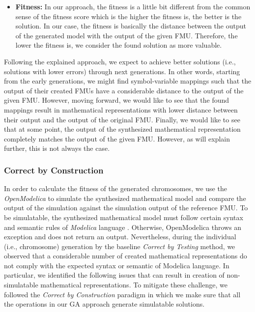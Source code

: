 \begin{itemize}
    \item \textbf{Fitness:} In our approach, the fitness is a little bit different from the common sense of the fitness score which is the higher the fitness is, the better is the solution. In our case, the fitness is basically the distance between the output of the generated model with the output of the given FMU. Therefore, the lower the fitness is, we consider the found solution as more valuable. 

\end{itemize}

Following the explained approach, we expect to achieve better solutions (i.e., solutions with lower errors) through next generations. In other words, starting from the early generations, we might find symbol-variable mappings such that the output of their created FMUs have a considerable distance to the output of the given FMU. However, moving forward, we would like to see that the found mappings result in mathematical representations with lower distance between their output and the output of the original FMU. Finally, we would like to see that at some point, the output of the synthesized mathematical representation completely matches the output of the given FMU. However, as will explain further, this is not always the case.

\subsubsection{Correct by Construction}

In order to calculate the fitness of the generated chromosomes, we use the \textit{OpenModelica} to simulate the synthesized mathematical model and compare the output of the simulation against the simulation output of the reference FMU. To be simulatable, the synthesized mathematical model must follow certain syntax and semantic rules of \textit{Modelica} language . Otherwise, OpenModelica throws an exception and does not return an output. Nevertheless, during the individual (i.e., chromosome) generation by the baseline \textit{Correct by Testing} method, we observed that a considerable number of created mathematical representations do not comply with the expected syntax or semantic of Modelica language. In particular, we identified the following issues that can result in creation of non-simulatable mathematical representations. To mitigate these challenge, we followed the \textit{Correct by Construction} paradigm in which we make sure that all the operations in our GA approach generate simulatable solutions. 


